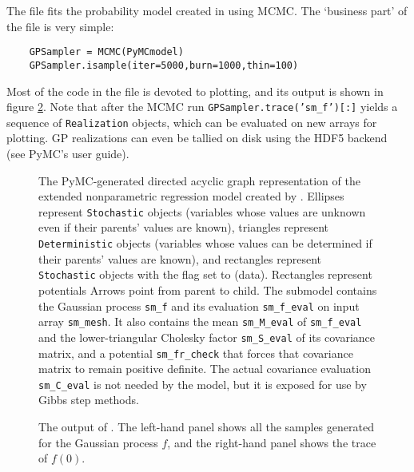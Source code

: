 The file  fits the probability model created in  using MCMC. The `business part' of the file is very simple:
\begin{verbatim}
    GPSampler = MCMC(PyMCmodel)
    GPSampler.isample(iter=5000,burn=1000,thin=100)
\end{verbatim}
Most of the code in the file is devoted to plotting, and its output is shown in figure \ref{fig:MCMCOutput}. Note that after the MCMC run \texttt{GPSampler.trace('sm_f')[:]} yields a sequence of \texttt{Realization} objects, which can be evaluated on new arrays for plotting. GP realizations can even be tallied on disk using the HDF5 backend (see PyMC's user guide).

\begin{figure}
    \centering
    \caption{The PyMC-generated directed acyclic graph representation of the extended nonparametric regression model created by . Ellipses represent \texttt{Stochastic} objects (variables whose values are unknown even if their parents' values are known), triangles represent \texttt{Deterministic} objects (variables whose values can be determined if their parents' values are known), and rectangles represent \texttt{Stochastic} objects with the  flag set to  (data). Rectangles represent potentials Arrows point from parent to child. The submodel contains the Gaussian process \texttt{sm\_f} and its evaluation \texttt{sm\_f\_eval} on input array \texttt{sm\_mesh}. It also contains the mean \texttt{sm\_M\_eval} of \texttt{sm\_f\_eval} and the lower-triangular Cholesky factor \texttt{sm\_S\_eval} of its covariance matrix, and a potential \texttt{sm_fr_check} that forces that covariance matrix to remain positive definite. The actual covariance evaluation \texttt{sm\_C\_eval} is not needed by the model, but it is exposed for use by Gibbs step methods.}
    \label{fig:unobservedModel}
\end{figure}

\begin{figure}
    \centering
    \caption{The output of . The left-hand panel shows all the samples generated for the Gaussian process $f$, and the right-hand panel shows the trace of $f(0)$.}
    \label{fig:MCMCOutput}
\end{figure}







